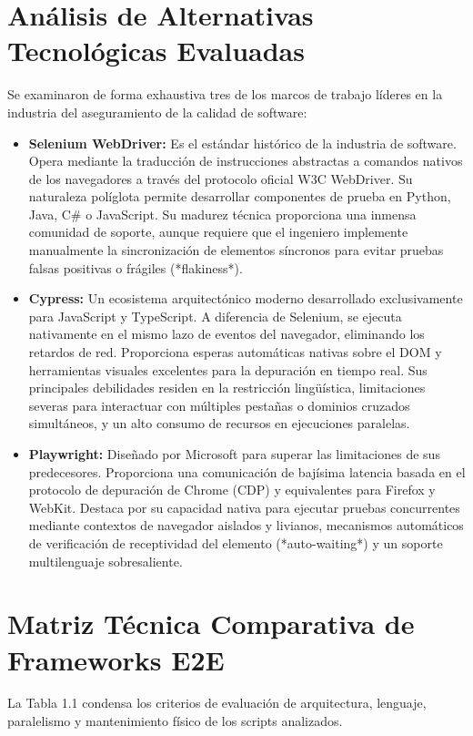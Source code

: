 \documentclass[12pt,oneside]{report}
\begin{document}
\section{Análisis de Alternativas Tecnológicas Evaluadas}
Se examinaron de forma exhaustiva tres de los marcos de trabajo líderes en la industria del aseguramiento de la calidad de software:
\begin{itemize}
    \item \textbf{Selenium WebDriver:} Es el estándar histórico de la industria de software. Opera mediante la traducción de instrucciones abstractas a comandos nativos de los navegadores a través del protocolo oficial W3C WebDriver. Su naturaleza políglota permite desarrollar componentes de prueba en Python, Java, C\# o JavaScript. Su madurez técnica proporciona una inmensa comunidad de soporte, aunque requiere que el ingeniero implemente manualmente la sincronización de elementos síncronos para evitar pruebas falsas positivas o frágiles (*flakiness*).
    \item \textbf{Cypress:} Un ecosistema arquitectónico moderno desarrollado exclusivamente para JavaScript y TypeScript. A diferencia de Selenium, se ejecuta nativamente en el mismo lazo de eventos del navegador, eliminando los retardos de red. Proporciona esperas automáticas nativas sobre el DOM y herramientas visuales excelentes para la depuración en tiempo real. Sus principales debilidades residen en la restricción lingüística, limitaciones severas para interactuar con múltiples pestañas o dominios cruzados simultáneos, y un alto consumo de recursos en ejecuciones paralelas.
    \item \textbf{Playwright:} Diseñado por Microsoft para superar las limitaciones de sus predecesores. Proporciona una comunicación de bajísima latencia basada en el protocolo de depuración de Chrome (CDP) y equivalentes para Firefox y WebKit. Destaca por su capacidad nativa para ejecutar pruebas concurrentes mediante contextos de navegador aislados y livianos, mecanismos automáticos de verificación de receptividad del elemento (*auto-waiting*) y un soporte multilenguaje sobresaliente.
\end{itemize}

\section{Matriz Técnica Comparativa de Frameworks E2E}
La Tabla 1.1 condensa los criterios de evaluación de arquitectura, lenguaje, paralelismo y mantenimiento físico de los scripts analizados.
\end{document}
